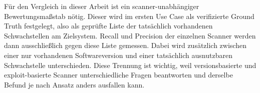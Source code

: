 Für den Vergleich in dieser Arbeit ist ein scanner-unabhängiger Bewertungsmaßstab nötig. Dieser
wird im ersten Use Case als verifizierte Ground Truth festgelegt, also als geprüfte Liste der
tatsächlich vorhandenen Schwachstellen am Zielsystem. Recall und Precision der einzelnen Scanner
werden dann ausschließlich gegen diese Liste gemessen. Dabei wird zusätzlich zwischen einer nur
vorhandenen Softwareversion und einer tatsächlich ausnutzbaren Schwachstelle unterschieden. Diese
Trennung ist wichtig, weil versionsbasierte und exploit-basierte Scanner unterschiedliche Fragen
beantworten und derselbe Befund je nach Ansatz anders ausfallen kann.










